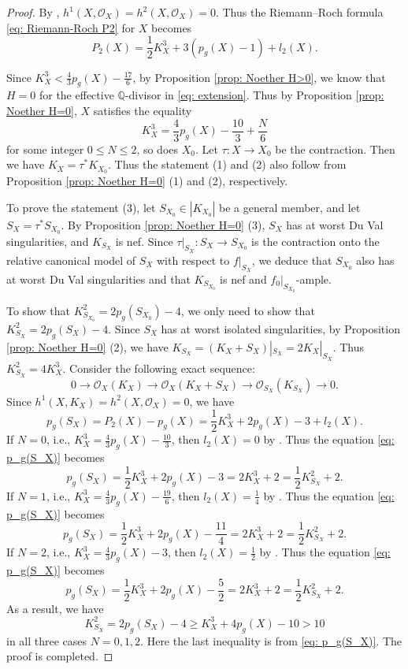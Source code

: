 \documentclass[a4paper,11pt]{amsart}
\theoremstyle{definition}
\theoremstyle{remark}
\numberwithin{equation}{section}
\begin{document}
\begin{proof}
	By \cite[Lemma 3.4]{HZ}, $h^1(X, \mathcal{O}_X) = h^2(X, \mathcal{O}_X) = 0$. Thus the Riemann--Roch formula \eqref{eq: Riemann-Roch P2} for $X$ becomes
	$$
	P_2(X) = \frac{1}{2}K_X^3 + 3\left(p_g(X) - 1\right) + l_2(X).
	$$
	
	Since $K_X^3 < \frac{4}{3}p_g(X) - \frac{17}{6}$, by Proposition \ref{prop: Noether H>0}, we know that $H = 0$ for the effective $\mathbb{Q}$-divisor in \eqref{eq: extension}. Thus by Proposition \ref{prop: Noether H=0}, $X$ satisfies the equality
	$$
	K_X^3 = \frac{4}{3}p_g(X) - \frac{10}{3} + \frac{N}{6}
	$$
	for some integer $0 \le N \leq 2$, so does $X_0$. Let $\tau: X \to X_0$ be the contraction. Then we have $K_X = \tau^*K_{X_0}$. Thus the statement (1) and (2) also follow from Proposition \ref{prop: Noether H=0} (1) and (2), respectively.
	
	To prove the statement (3), let $S_{X_0} \in |K_{X_0}|$ be a general member, and let $S_X = \tau^*S_{X_0}$. By Proposition \ref{prop: Noether H=0} (3), $S_X$ has at worst Du Val singularities, and $K_{S_X}$ is nef. Since $\tau|_{S_X}: S_X \to S_{X_0}$ is the contraction onto the relative canonical model of $S_X$ with respect to $f|_{S_X}$, we deduce that $S_{X_0}$ also has at worst Du Val singularities and that $K_{S_{X_0}}$ is nef and $f_0|_{S_{X_0}}$-ample.
	
	To show that $K_{S_{X_0}}^2 = 2p_g(S_{X_0}) - 4$, we only need to show that $K_{S_X}^2 = 2p_g(S_X) - 4$. Since $S_X$ has at worst isolated singularities, by Proposition \ref{prop: Noether H=0} (2), we have $K_{S_X} = (K_X + S_X)|_{S_X} = 2K_X|_{S_X}$. Thus $K_{S_X}^2 = 4K_X^3$. Consider the following exact sequence:
	$$
	0 \to \mathcal{O}_X(K_X)\to \mathcal{O}_X(K_X + S_X) \to \mathcal{O}_{S_X}(K_{S_X}) \to 0.
	$$
	Since $h^1(X, K_X) = h^2(X, \mathcal{O}_X) = 0$, we have
	\begin{equation} \label{eq: p_g(S_X)}
		p_g(S_X) = P_2(X) - p_g(X) = \frac{1}{2}K_X^3 + 2p_g(X) - 3 + l_2(X).
	\end{equation}
	If $N = 0$, i.e., $K_X^3 = \frac{4}{3}p_g(X) - \frac{10}{3}$, then $l_2(X)=0$ by \cite[Proposition 4.3]{HZ}. Thus the equation \eqref{eq: p_g(S_X)} becomes
	$$
	p_g(S_X) = \frac{1}{2}K_X^3 + 2p_g(X) - 3 = 2K_X^3 + 2 = \frac{1}{2} K_{S_X}^2 + 2.
	$$
	If $N = 1$, i.e., $K_X^3 = \frac{4}{3}p_g(X) - \frac{19}{6}$, then $l_2(X)=\frac{1}{4}$ by \cite[Proposition 4.4]{HZ}. Thus the equation \eqref{eq: p_g(S_X)} becomes
	$$
	p_g(S_X) = \frac{1}{2}K_X^3 + 2p_g(X) - \frac{11}{4} = 2K_X^3 + 2 = \frac{1}{2} K_{S_X}^2 + 2.
	$$
	If $N = 2$, i.e., $K_X^3 = \frac{4}{3}p_g(X) - 3$, then $l_2(X)=\frac{1}{2}$ by \cite[Proposition 4.4]{HZ}. Thus the equation \eqref{eq: p_g(S_X)} becomes
	$$
	p_g(S_X) = \frac{1}{2}K_X^3 + 2p_g(X) - \frac{5}{2} = 2K_X^3 + 2 = \frac{1}{2} K_{S_X}^2 + 2.
	$$
	As a result, we have 
	$$
	K_{S_X}^2 = 2p_g(S_X) - 4 \ge K_X^3 + 4p_g(X) - 10 > 10
	$$
	in all three cases $N = 0, 1, 2$. Here the last inequality is from \eqref{eq: p_g(S_X)}. The proof is completed.
\end{proof}
\end{document}
